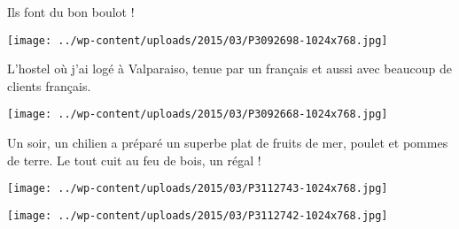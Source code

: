 \pagebreak
Ils font du bon boulot !
\begin{center} \texttt{[image: ../wp-content/uploads/2015/03/P3092698-1024x768.jpg]} \end{center}

 L'hostel où j'ai logé à Valparaiso, tenue par un français et aussi avec beaucoup de clients français.
\begin{center} \texttt{[image: ../wp-content/uploads/2015/03/P3092668-1024x768.jpg]} \end{center}

\pagebreak
 Un soir, un chilien a préparé un superbe plat de fruits de mer, poulet et pommes de terre. Le tout cuit au feu de bois, un régal !
\begin{center} \texttt{[image: ../wp-content/uploads/2015/03/P3112743-1024x768.jpg]} \end{center}
\begin{center} \texttt{[image: ../wp-content/uploads/2015/03/P3112742-1024x768.jpg]} \end{center}

\pagebreak
